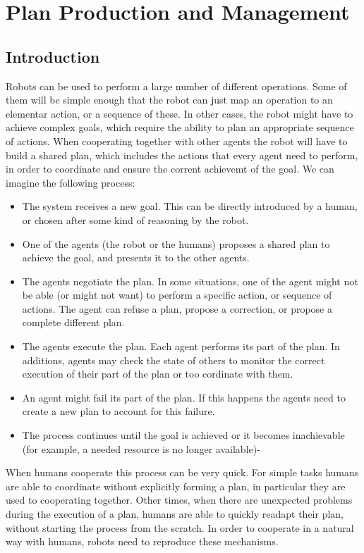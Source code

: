 
\chapter{Plan Production and Management} %

\label{chapter-plan_management} %



\section{Introduction}
Robots can be used to perform a large number of different operations. Some of them will be simple enough that the robot can just map an operation to an elementar action, or a sequence of these. In other cases, the robot might have to  achieve complex goals, which require the ability to plan an appropriate sequence of actions. When cooperating together with other agents the robot will have to build a shared plan, which includes the actions that every agent need to perform, in order to coordinate and ensure the corrent achievemt of the goal. We can imagine the following process:
\begin{itemize}
	\item The system receives a new goal. This can be directly introduced by a human, or chosen after some kind of reasoning by the robot.
	\item One of the agents (the robot or the humans) proposes a shared plan to achieve the goal, and presents it to the other agents.
	\item The agents negotiate the plan. In some situations, one of the agent might not be able (or might not want) to perform a specific action, or sequence of actions. The agent can refuse a plan, propose a correction, or propose a complete different plan.
	\item The agents execute the plan. Each agent performs its part of the plan. In additions, agents may check the state of others to monitor the correct execution of their part of the plan or too cordinate with them.
	\item An agent might fail its part of the plan. If this happens the agents need to create a new plan to account for this failure.
 	\item The process continues until the goal is achieved or it becomes inachievable (for example, a needed resource is no longer available)-
\end{itemize} 
When humans cooperate this process can be very quick. For simple tasks humans are able to coordinate without explicitly forming a plan, in particular they are used to cooperating together. Other times, when there are unexpected problems during the execution of a plan, humans are able to quickly readapt their plan, without starting the process from the scratch. In order to cooperate in a natural way with humans, robots need to reproduce these mechanisms.


